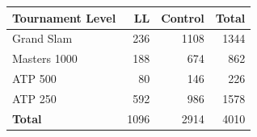 \begin{tabular}{lrrr}
\toprule
Tournament Level & LL & Control & Total \\
\midrule
Grand Slam & 236 & 1108 & 1344 \\
Masters 1000 & 188 & 674 & 862 \\
ATP 500 & 80 & 146 & 226 \\
ATP 250 & 592 & 986 & 1578 \\
\midrule
\textbf{Total} & 1096 & 2914 & 4010 \\
\bottomrule
\end{tabular}
